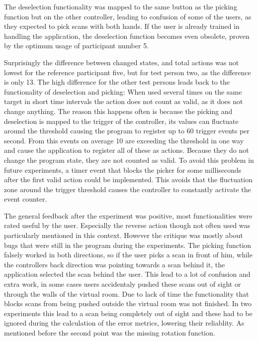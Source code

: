 \documentclass[hyperref,english,bachelorofscience,bibnum,twoside]{cgvpub}
\begin{document}
The deselection functionality was mapped to the same button as the picking function but on the other controller, leading to confusion of some of the users, as they expected to pick scans with both hands. If the user is already trained in handling the application, the deselection function becomes even obsolete, proven by the optimum usage of participant number 5. 

Surprisingly the difference between changed states, and total actions was not lowest for the reference participant five, but for test person two, as the difference is only 13. The  high difference for the other test persons leads back to the functionality of deselection and picking: When used several times on the same target in short time intervals the action does not count as valid, as it does not change anything. The reason this happens often is because the picking and deselection is mapped to the trigger of the controller, its values can fluctuate around the threshold causing the program to register up to 60 trigger events per second. From this events on average 10 are exceeding the threshold in one way and cause the application to register all of these as actions. Because they do not change the program state, they are not counted as valid. To avoid this problem in future experiments, a timer event that blocks the picker for some milliseconds after the first valid action could be implemented. This avoids that the fluctuation zone around the trigger threshold causes the controller to constantly activate the event counter.

The general feedback after the experiment was positive, most functionalities were rated useful by the user. Especially the reverse action though not often used was particularly mentioned in this context. However the critique was mostly about bugs that were still in the program during the experiments. The picking function falsely worked in both directions, so if the user picks a scan in front of him, while the controllers back direction was pointing towards a scan behind it, the application selected the scan behind the user. This lead to a lot of confusion and extra work, in some cases users accidentaly pushed these scans out of sight or through the walls of the virtual room. Due to lack of time the functionality that blocks scans from being pushed outside the virtual room was not finished. In two experiments this lead to a scan being completely out of sight and these had to be ignored during the calculation of the error metrics, lowering their reliablity. As mentioned before the second point was the missing rotation function.
\end{document}
